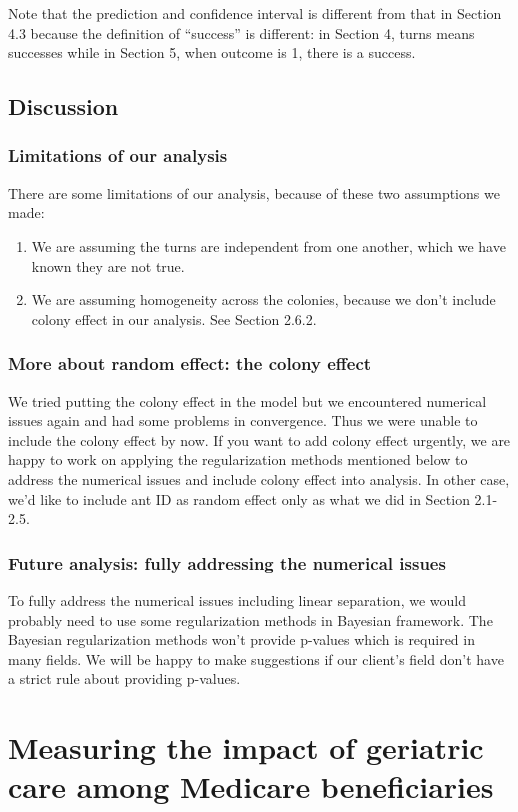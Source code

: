 \documentclass{article}
\begin{document}
	Note that the prediction and confidence interval is different from that in Section 4.3 because the definition of “success” is different: in Section 4, turns means successes while in Section 5, when outcome is 1, there is a success.
	\subsection{Discussion}
	\subsubsection{Limitations of our analysis}
	There are some limitations of our analysis, because of these two assumptions we made: 
	\begin{enumerate}
		\item We are assuming the turns are independent from one another, which we have known they are not true.
		\item We are assuming homogeneity across the colonies, because we don’t include colony effect in our analysis. See Section 2.6.2.
	\end{enumerate} 
	\subsubsection{More about random effect: the colony effect}
	We tried putting the colony effect in the model but we encountered numerical issues again and had some problems in convergence. Thus we were unable to include the colony effect by now. If you want to add colony effect urgently, we are happy to work on applying the regularization methods mentioned below to address the numerical issues and include colony effect into analysis. In other case, we’d like to include ant ID as random effect only as what we did in Section 2.1-2.5.
	\subsubsection{Future analysis: fully addressing the numerical issues}
	To fully address the numerical issues including linear separation, we would probably need to use some regularization methods in Bayesian framework. The Bayesian regularization methods won’t provide p-values which is required in many fields. We will be happy to make suggestions if our client's field don’t have a strict rule about providing p-values.
	
	
	
	
	
	\section{Measuring the impact of geriatric care among Medicare beneficiaries}
\end{document}
